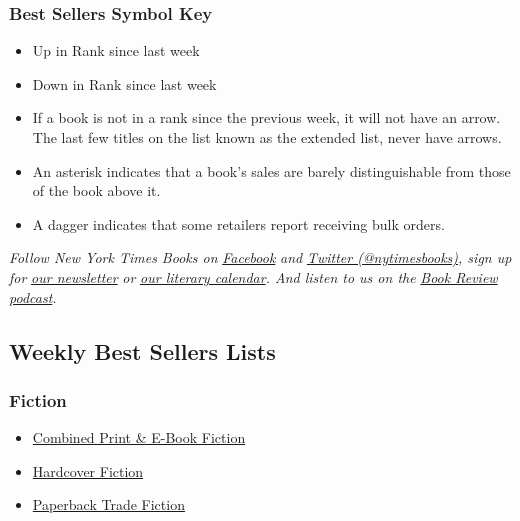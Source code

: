 \hypertarget{best-sellers-symbol-key}{%
\subsubsection{Best Sellers Symbol Key}\label{best-sellers-symbol-key}}

\begin{itemize}
\item
  Up in Rank since last week
\item
  Down in Rank since last week
\item
  If a book is not in a rank since the previous week, it will not have
  an arrow. The last few titles on the list known as the extended list,
  never have arrows.
\item
  An asterisk indicates that a book's sales are barely distinguishable
  from those of the book above it.
\item
  A dagger indicates that some retailers report receiving bulk orders.
\end{itemize}

\emph{Follow New York Times Books on}
\href{https://www.facebookcorewwwi.onion/nytbooks/}{\emph{Facebook}}
\emph{and} \href{https://twitter.com/nytimesbooks}{\emph{Twitter
(@nytimesbooks)}}\emph{, sign up for}
\href{https://www.nytimes3xbfgragh.onion/newsletters/books-review}{\emph{our
newsletter}} \emph{or}
\href{https://www.nytimes3xbfgragh.onion/interactive/2017/books/books-calendar.html}{\emph{our
literary calendar}}\emph{. And listen to us on the}
\href{https://www.nytimes3xbfgragh.onion/column/book-review-podcast}{\emph{Book
Review podcast}}\emph{.}

\hypertarget{weekly-best-sellers-lists}{%
\subsection{Weekly Best Sellers Lists}\label{weekly-best-sellers-lists}}

\hypertarget{fiction}{%
\subsubsection{Fiction}\label{fiction}}

\begin{itemize}
\tightlist
\item
  \href{/books/best-sellers/combined-print-and-e-book-fiction/}{Combined
  Print \& E-Book Fiction}
\item
  \href{/books/best-sellers/hardcover-fiction/}{Hardcover Fiction}
\item
  \href{/books/best-sellers/trade-fiction-paperback/}{Paperback Trade
  Fiction}
\end{itemize}

